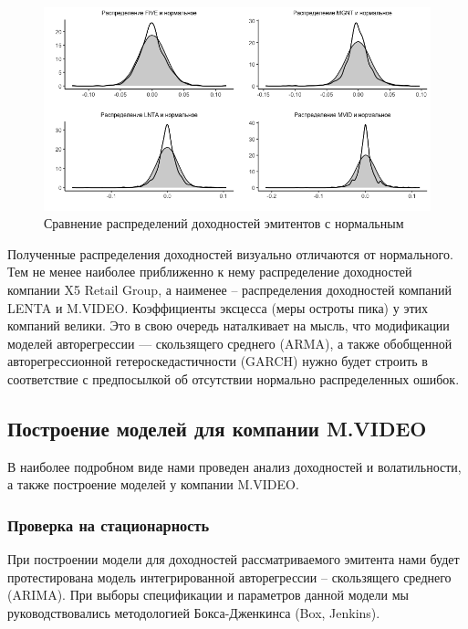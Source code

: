 \documentclass[a4paper,12pt,twoside]{article}
\begin{document}
\begin{figure}[!h]
    \includegraphics[scale = 0.55]{dist_01.png}
    \caption{Сравнение распределений доходностей эмитентов с нормальным}
    \label{fig:dist_01}
\end{figure}

Полученные распределения доходностей визуально отличаются от нормального.
Тем не менее наиболее приближенно к нему распределение доходностей компании X5 Retail Group, а наименее – распределения доходностей компаний LENTA и M.VIDEO. Коэффициенты эксцесса (меры остроты пика) у этих компаний велики.
Это в свою очередь наталкивает на мысль, что модификации моделей авторегрессии — скользящего среднего (ARMA), а также обобщенной авторегрессионной гетероскедастичности (GARCH) нужно будет строить в соответствие с предпосылкой об отсутствии нормально распределенных ошибок.

\subsection{Построение моделей для компании M.VIDEO}

В наиболее подробном виде нами проведен анализ доходностей и волатильности, а также построение моделей у компании M.VIDEO.

\subsubsection{Проверка на стационарность}

При построении модели для доходностей рассматриваемого эмитента нами будет протестирована модель интегрированной авторегрессии – скользящего среднего (ARIMA).
При выборы спецификации и параметров данной модели мы руководствовались методологией Бокса-Дженкинса (Box, Jenkins).
\end{document}
